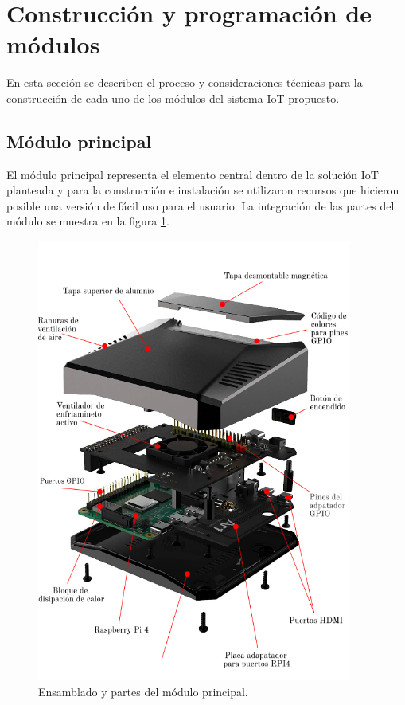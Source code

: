 \section{Construcción y programación de módulos}

En esta sección se describen el proceso y consideraciones técnicas para la construcción de cada uno de los módulos del sistema IoT propuesto.
\subsection{Módulo principal}

El módulo principal representa el elemento central dentro de la solución IoT planteada y para la construcción e instalación se utilizaron recursos que hicieron posible una versión de fácil uso para el usuario. La integración de las partes del módulo se muestra en la figura \ref{fig:argon}.

\begin{figure}[htpb]
\centering 
\includegraphics[width=0.92\textwidth]{./Figures/armadoactuador.png}
\caption{Ensamblado y partes del módulo principal. }
\label{fig:argon}
\end{figure}


